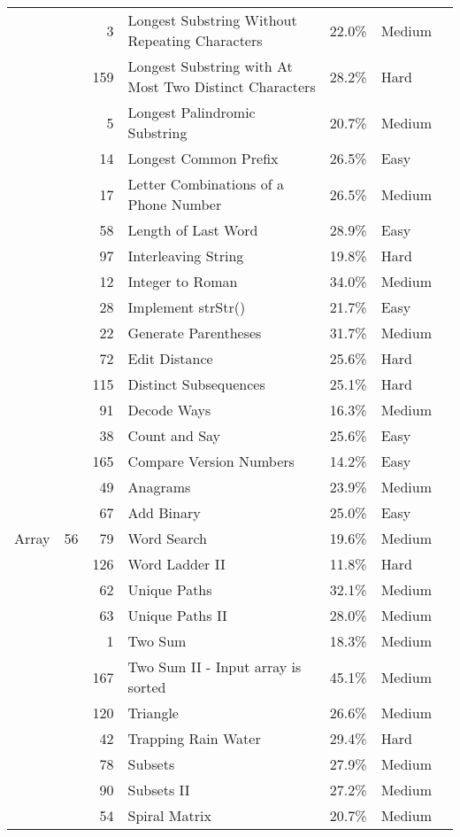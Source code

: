 \documentclass[9pt,b5paper]{article}
\begin{document}
\begin{center}
\begin{tabular}{lrrllll}
 &  & 3 & Longest Substring Without Repeating Characters & 22.0\% & Medium & \\
 &  & 159 & Longest Substring with At Most Two Distinct Characters & 28.2\% & Hard & \\
 &  & 5 & Longest Palindromic Substring & 20.7\% & Medium & \\
 &  & 14 & Longest Common Prefix & 26.5\% & Easy & \\
 &  & 17 & Letter Combinations of a Phone Number & 26.5\% & Medium & \\
 &  & 58 & Length of Last Word & 28.9\% & Easy & \\
 &  & 97 & Interleaving String & 19.8\% & Hard & \\
 &  & 12 & Integer to Roman & 34.0\% & Medium & \\
 &  & 28 & Implement strStr() & 21.7\% & Easy & \\
 &  & 22 & Generate Parentheses & 31.7\% & Medium & \\
 &  & 72 & Edit Distance & 25.6\% & Hard & \\
 &  & 115 & Distinct Subsequences & 25.1\% & Hard & \\
 &  & 91 & Decode Ways & 16.3\% & Medium & \\
 &  & 38 & Count and Say & 25.6\% & Easy & \\
 &  & 165 & Compare Version Numbers & 14.2\% & Easy & \\
 &  & 49 & Anagrams & 23.9\% & Medium & \\
 &  & 67 & Add Binary & 25.0\% & Easy & \\
\hline
Array & 56 & 79 & Word Search & 19.6\% & Medium & \\
 &  & 126 & Word Ladder II & 11.8\% & Hard & \\
 &  & 62 & Unique Paths & 32.1\% & Medium & \\
 &  & 63 & Unique Paths II & 28.0\% & Medium & \\
 &  & 1 & Two Sum & 18.3\% & Medium & \\
 &  & 167 & Two Sum II - Input array is sorted & 45.1\% & Medium & \\
 &  & 120 & Triangle & 26.6\% & Medium & \\
 &  & 42 & Trapping Rain Water & 29.4\% & Hard & \\
 &  & 78 & Subsets & 27.9\% & Medium & \\
 &  & 90 & Subsets II & 27.2\% & Medium & \\
 &  & 54 & Spiral Matrix & 20.7\% & Medium & \\

\end{tabular}
\end{center}
\end{document}
